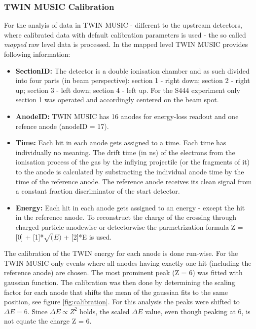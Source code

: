 \subsubsection{TWIN MUSIC Calibration}
For the analyis of data in TWIN MUSIC - different to the upstream detectors, where calibrated data with default calibration parameters is used - the so called \textit{mapped} raw level data is processed. In the mapped level TWIN MUSIC provides following information:
\begin{itemize}
\itemsep0em 
\item \textbf{SectionID:} The detector is a double ionisation chamber and as such divided into four parts (in beam perspective): section 1 - right down; section 2 - right up; section 3 - left down; section 4 - left up. For the S444 experiment only section 1 was operated and accordingly centered on the beam spot.
\item \textbf{AnodeID:} TWIN MUSIC has 16 anodes for energy-loss readout and one refence anode (anodeID = 17).
\item \textbf{Time:} Each hit in each anode gets assigned to a time. Each time has individually no meaning. The drift time (in ns) of the electrons from the ionisation process of the gas by the inflying projectile (or the fragments of it) to the anode is calculated by substracting the individual anode time by the time of the reference anode. The reference anode receives its clean signal from a constant fraction discriminator of the start detector.
\item \textbf{Energy:} Each hit in each anode gets assigned to an energy - except the hit in the reference anode. To reconstruct the charge of the crossing through charged particle anodewise or detectorwise the parmetrization formula Z = [0] + [1]*$\sqrt(E)$ + [2]*E is used. 
\end{itemize}
The calibration of the TWIN energy for each anode is done run-wise. 
For the TWIN MUSIC only events where all anodes having exactly one hit (including the reference anode) are chosen. The most prominent peak (Z = 6) was fitted with gaussian function. The calibration was then done by determining the scaling factor for each anode  that shifts the mean of the gaussian fits to the same position, see figure \ref{fig:calibration}. For this analysis the peaks were shifted to $\Delta E = 6$. Since $\Delta E \propto Z^2$ holds, the scaled $\Delta E$ value, even though peaking at 6, is not equate the charge Z = 6.

